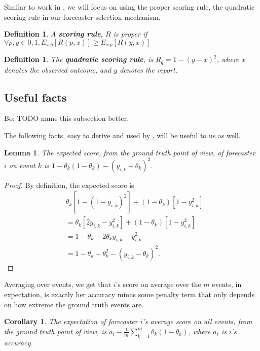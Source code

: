 \documentclass[letterpaper,12pt]{article}
\newcommand{\1}{\mathbbm{1}}
\newtheorem{corollary}[theorem]{Corollary}
\newtheorem{lemma}[theorem]{Lemma}
\newtheorem{definition}[theorem]{Definition}
\begin{document}
Similar to work in \cite{witkowski2018incentive}, we will focus on using the proper scoring rule, the quadratic scoring rule in our forecaster selection mechanism.

\begin{definition}
  \label{scoring_rule}
  A \textbf{scoring rule}, $R$ is proper if $\forall p,y \in {0,1}, E_{x~p}[R(p,x)] \ge E_{x~p}[R(y,x)]$
\end{definition}

\begin{definition}
  \label{quadratic_scoring_rule}
  The \textbf{quadratic scoring rule}, is $R_q = 1 - (y - x)^2$, where $x$ denotes the observed outcome, and $y$ denotes the report.
\end{definition}

\subsection{Useful facts}
Bo: TODO name this subsection better.

The following facts, easy to derive and used by \citet{witkowski2018incentive}, will be useful to us as well.

\begin{lemma} \label{lemma:score-accuracy}
  The expected score, from the ground truth point of view, of forecaster $i$ on event $k$ is $1 - \theta_k(1-\theta_k) - (y_{i,k} - \theta_k)^2$.
\end{lemma}
\begin{proof}
By definition, the expected score is
\begin{align*}
  &\theta_k \left[1 - (1 - y_{i,k})^2\right] + (1 - \theta_k) \left[1 - y_{i,k}^2\right]  \\
  &= \theta_k \left[2y_{i,k} - y_{i,k}^2\right] + (1-\theta_k)\left[1 - y_{i,k}^2\right]  \\
  &= 1 - \theta_k + 2 \theta_k y_{i,k} - y_{i,k}^2  \\
  &= 1 - \theta_k + \theta_k^2 - (y_{i,k} - \theta_k)^2 .
\end{align*}
\end{proof}

Averaging over events, we get that $i$'s score on average over the $m$ events, in expectation, is exactly her accuracy minus some penalty term that only depends on how extreme the ground truth events are.
\begin{corollary} \label{cor:avg-score-accuracy}
  The expectation of forecaster $i$'s average score on all events, from the ground truth point of view, is $a_i - \frac{1}{m}\sum_{k=1}^m \theta_k (1 - \theta_k)$, where $a_i$ is $i$'s accuracy.
\end{corollary}
\end{document}
